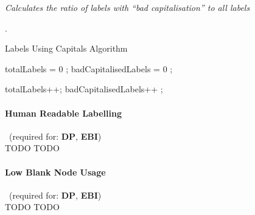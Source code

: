 \begin{mdframed}[style=metricdefinition]
\emph{Calculates the ratio of labels with ``bad capitalisation'' to all labels}
\end{mdframed}
.

\begin{algorithm}
\caption{Labels Using Capitals Algorithm}\label{lst:badCapitals}
\begin{algorithmic}[1]
\State totalLabels = 0 ;
\State badCapitalisedLabels = 0 ;
\EndProcedure

 totalLabels++; \EndIf
{}badCapitalisedLabels++ ; \EndIf
{}
\EndProcedure
\end{algorithmic}
\end{algorithm}

\paragraph{Human Readable Labelling}~(required for: \textbf{DP}, \textbf{EBI})~\\
TODO TODO

\paragraph{Low Blank Node Usage}~(required for: \textbf{DP}, \textbf{EBI})~\\
TODO TODO



